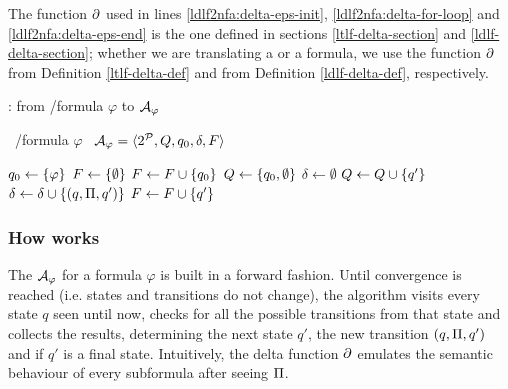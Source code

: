 The function $\partial$ used in lines \ref{ldlf2nfa:delta-eps-init}, \ref{ldlf2nfa:delta-for-loop} and \ref{ldlf2nfa:delta-eps-end} is the one defined in sections \ref{ltlf-delta-section} and \ref{ldlf-delta-section}; whether we are translating a \LTLf or a \LDLf formula, we use the function $\partial$ from Definition \ref{ltlf-delta-def} and from Definition \ref{ldlf-delta-def}, respectively.
\begin{algorithm}
	\caption{\LDLfToNFA: from \LTLf/\LDLf formula $\varphi$ to \NFA $\mathcal{A}_\varphi$}
	\label{alg:ldl2nfa}
	\begin{algorithmic}[1]
		\State \algInput\ \LDLf/\LTLf formula $\varphi$
		\State \algOutput\ \NFA $\mathcal{A}_\varphi = \langle 2^{\mathcal{P}}, Q, q_0, \delta, F \rangle$
		
		\State $q_0 \gets \{\varphi\}$
		\State $F \gets \{\emptyset\}$
		\If{$(\DfunEps{\varphi} = \true)$} \label{ldlf2nfa:delta-eps-init}
			\State $F \gets F \cup \{q_0\}$
		\EndIf
		\State $Q \gets \{q_0, \emptyset\}$
		\State $\delta \gets \emptyset$
			 \label{ldlf2nfa:main-for-loop}
				 \label{ldlf2nfa:delta-for-loop}
					\State $Q \gets Q \cup \{q'\}$
					\State $\delta \gets \delta \cup \{(q, \Pi, q')\}$
					 \label{ldlf2nfa:delta-eps-end}
						\State $F \gets F \cup \{q'\}$
					\EndIf
				\EndIf
				
			\EndFor
		
		\EndWhile
		
	
	\end{algorithmic}
	
\end{algorithm}

\subsubsection*{How \LDLfToNFA works}
The \NFA $\mathcal{A}_\varphi$ for a \LDLf formula $\varphi$ is built in a forward fashion. Until convergence is reached (i.e. states and transitions do not change), the algorithm visits every state $q$ seen until now, checks for all the possible transitions from that state and collects the results, determining the next state $q'$, the new transition $(q, \Pi, q')$ and if $q'$ is a final state. Intuitively, the delta function $\partial$ emulates the semantic behaviour of every \LLf subformula after seeing $\Pi$.

